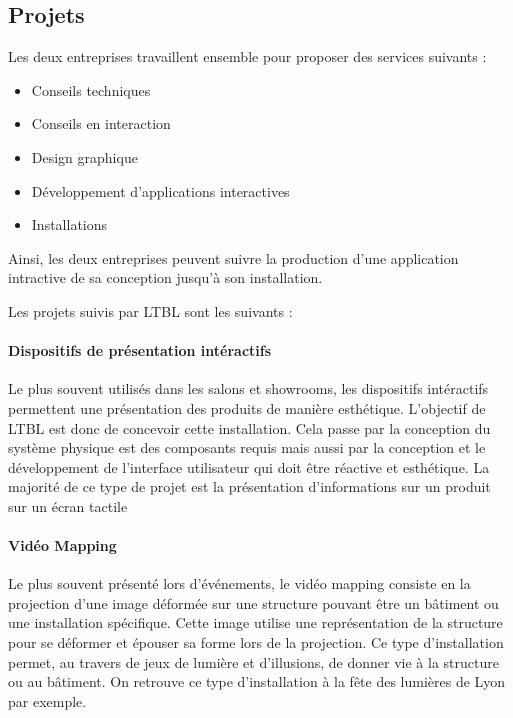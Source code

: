 \documentclass{article}
\begin{document}
\subsection{Projets}

Les deux entreprises travaillent ensemble pour proposer des services suivants :

\begin{itemize}
    \item Conseils techniques
    \item Conseils en interaction
    \item Design graphique
    \item Développement d'applications interactives
    \item Installations
\end{itemize}

Ainsi, les deux entreprises peuvent suivre la production d'une application intractive de sa conception jusqu'à son installation.

\medskip

Les projets suivis par LTBL sont les suivants :

\paragraph{Dispositifs de présentation intéractifs} Le plus souvent utilisés dans les salons et showrooms, les dispositifs intéractifs permettent une présentation des produits de manière esthétique.
L'objectif de LTBL est donc de concevoir cette installation.
Cela passe par la conception du système physique est des composants requis mais aussi par la conception et le développement de l'interface utilisateur qui doit être réactive et esthétique.
La majorité de ce type de projet est la présentation d'informations sur un produit sur un écran tactile

\paragraph{Vidéo Mapping} Le plus souvent présenté lors d'événements, le vidéo mapping consiste en la projection d'une image déformée sur une structure pouvant être un bâtiment ou une installation spécifique.
Cette image utilise une représentation de la structure pour se déformer et épouser sa forme lors de la projection.
Ce type d'installation permet, au travers de jeux de lumière et d'illusions, de donner vie à la structure ou au bâtiment.
On retrouve ce type d'installation à la fête des lumières de Lyon par exemple.
\end{document}
